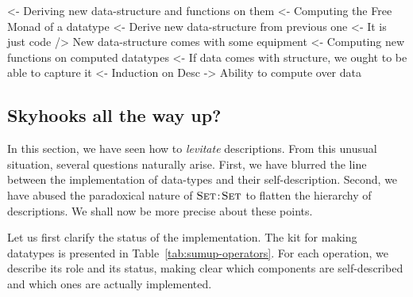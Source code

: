 \begin{wstructure}
<- Deriving new data-structure and functions on them
    <- Computing the Free Monad of a datatype
        <- Derive new data-structure from previous one
            <- It is just code
        /> New data-structure comes with some equipment
    <- Computing new functions on computed datatypes
        <- If data comes with structure, we ought to be able to capture it
            <- Induction on Desc
            -> Ability to compute over data
\end{wstructure}


\subsection{Skyhooks all the way up?}


In this section, we have seen how to \emph{levitate}
descriptions. From this unusual situation, several questions naturally
arise. First, we have blurred the line between the implementation of
data-types and their self-description. Second, we have abused the
paradoxical nature of $\Bhab{\Set}{\Set}$ to flatten the hierarchy of
descriptions. We shall now be more precise about these points.


Let us first clarify the status of the implementation. The kit for
making datatypes is presented in Table~\ref{tab:sumup-operators}. For
each operation, we describe its role and its status, making clear
which components are self-described and which ones are actually
implemented.

